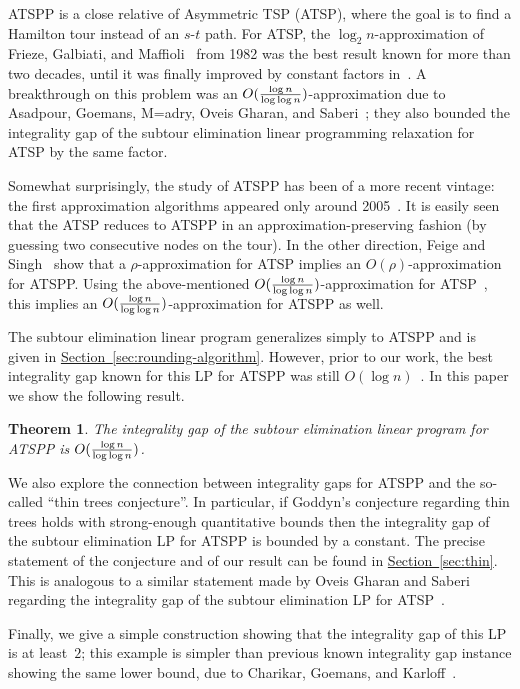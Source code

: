 \documentclass[11pt]{article}
\newcommand{\lref}[2][]{\hyperref[#2]{#1~\ref*{#2}}}
\newtheorem{theorem}{Theorem}[section]
\theoremstyle{definition}
\newcommand{\factor}{\ensuremath{O(\smash{\frac{\log n}{\log\log n}})}}
\def\polhk#1{\setbox0=\hbox{#1}{\ooalign{\hidewidth\lower1.5ex\hbox{`}\hidewidth\crcr\unhbox0}}}
\begin{document}
ATSPP is a close relative of Asymmetric TSP
(ATSP), where the goal is to find a Hamilton tour instead of an $s$-$t$
path.  For ATSP, the $\log_2 n$-approximation of Frieze,
Galbiati, and Maffioli~\cite{FGM} from 1982 was the best result known
for more than two decades, until it was finally improved by constant
factors in~\cite{Blaser08,KLSS05,FS07}. A breakthrough on this problem
was an $\factor$-approximation due to Asadpour, Goemans,
M{\polhk{a}}dry, Oveis Gharan, and Saberi~\cite{AGMSS}; they also
bounded the integrality gap of the subtour elimination linear
programming relaxation for ATSP by the same factor.

Somewhat surprisingly, the study of ATSPP has been of a more recent
vintage: the first approximation algorithms appeared only around
2005~\cite{LN08,CP07,FS07}. It is easily seen that the ATSP reduces to
ATSPP in an approximation-preserving fashion (by guessing two
consecutive nodes on the tour).  In the other direction, Feige and Singh~\cite{FS07}
show that a $\rho$-approximation for ATSP implies an
$O(\rho)$-approximation for ATSPP. Using the above-mentioned
$\factor$-approximation for ATSP~\cite{AGMSS}, this implies an
$\factor$-approximation for ATSPP as well.

The subtour elimination linear program generalizes simply to ATSPP
and is given in \lref[Section]{sec:rounding-algorithm}. However,
prior to our work, the best integrality gap known for this LP for ATSPP was still $O(\log
n)$~\cite{FSS10}. In this paper we show the following result.

\begin{theorem}\label{thm:main}
  The integrality gap of the subtour elimination linear program for
  ATSPP is $\factor$.
\end{theorem}

We also explore the connection between integrality gaps for ATSPP
and the so-called ``thin trees conjecture''. In particular, if Goddyn's conjecture
regarding thin trees holds with strong-enough quantitative bounds
then the integrality gap of the subtour elimination LP for ATSPP
is bounded by a constant. The precise statement of the conjecture and of
our result can be found in \lref[Section]{sec:thin}. This is analogous to
a similar statement made by Oveis Gharan and Saberi regarding
the integrality gap of the subtour elimination LP for ATSP~\cite{GS11}.

Finally, we give a simple construction showing that the integrality gap of
this LP is at least~$2$; this example is simpler than previous known
integrality gap instance showing the same lower bound, due to Charikar,
Goemans, and Karloff~\cite{CGK06}.
\end{document}
